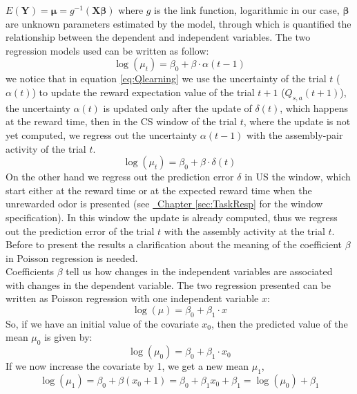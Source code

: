 $E (\mathbf {Y} )={\boldsymbol {\mu }}=g^{-1}(\mathbf {X} {\boldsymbol {\beta }})$ where $g$ is the link function, logarithmic in our case, $\boldsymbol{\beta}$ are unknown parameters estimated by the model, through which is quantified the relationship between the dependent and independent variables. The two regression models used can be written as follow:
\begin{equation}
    \log(\mu_t)=\beta_0+\beta\cdot\alpha(t-1)
    \label{eq:regrAlpha}
\end{equation}
we notice that in equation \ref{eq:Qlearning} we use the uncertainty of the trial $t$ ($\alpha(t)$) to update the reward expectation value of the trial $t+1$ ($Q_{s,a}(t+1)$), the uncertainty $\alpha(t)$ is updated only after the update of $\delta(t)$, which happens at the reward time, then in the CS window of the trial $t$, where the update is not yet computed, we regress out the uncertainty $\alpha(t-1)$ with the assembly-pair activity of the trial $t$.
\begin{equation}
    \log(\mu_t)=\beta_0+\beta\cdot\delta(t)
    \label{eq:regrDelta}
\end{equation}
On the other hand we regress out the prediction error $\delta$ in US the window, which start either at the reward time or at the expected reward time when the unrewarded odor is presented (see \hyperref[sec:TaskResp]{~Chapter \ref*{sec:TaskResp}} for the window specification). In this window the update is already computed, thus we regress out the prediction error of the trial $t$ with the assembly activity at the trial $t$.\\
Before to present the results a clarification about the meaning of the coefficient $\beta$ in Poisson regression is needed.\\
Coefficients $\beta$ tell us how changes in the independent variables are associated with changes in the dependent variable.
The two regression presented can be written as Poisson regression with one independent variable $x$:
\begin{equation}
    \log(\mu)=\beta_0+\beta_1\cdot x
    \label{eq:betaCoeff}
\end{equation}
So, if we have an initial value of the covariate $x_0$, then the predicted value of the mean $\mu_0$ is given by:
\begin{equation*}
    \log(\mu_0)=\beta_0+\beta_1\cdot x_0
    \label{eq:betaCoeff0}
\end{equation*}
If we now increase the covariate by 1, we get a new mean $\mu_1$,
\begin{equation*}
    \log(\mu_1)=\beta_0+\beta(x_0+1)=\beta_0+\beta_1x_0+\beta_1=\log(\mu_0)+\beta_1
    \label{eq:betaCoeff1}
\end{equation*}
